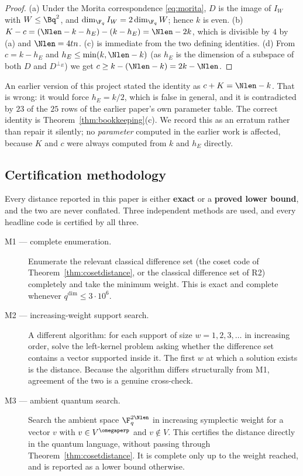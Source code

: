 \begin{proof}
(a) Under the Morita correspondence \eqref{eq:morita}, $D$ is the image of
$I_W$ with $W\le\Bq^2$, and $\dim_{\F_q}I_W=2\dim_{\F_q}W$; hence $k$ is even.
(b) $K-c=(\Nlen-k-h_E)-(k-h_E)=\Nlen-2k$, which is divisible by $4$ by (a)
and $\Nlen=4tn$. (c) is immediate from the two defining identities. (d) From
$c=k-h_E$ and $h_E\le\min(k,\Nlen-k)$ (as $h_E$ is the dimension of a subspace
of both $D$ and $D^{\perp_E}$) we get $c\ge k-(\Nlen-k)=2k-\Nlen$.
\end{proof}

\begin{remark}[erratum]
An earlier version of this project stated the identity as $c+K=\Nlen-k$. That
is wrong: it would force $h_E=k/2$, which is false in general, and it is
contradicted by $23$ of the $25$ rows of the earlier paper's own parameter
table. The correct identity is Theorem~\ref{thm:bookkeeping}(c). We record this
as an erratum rather than repair it silently; no \emph{parameter} computed in
the earlier work is affected, because $K$ and $c$ were always computed from
$k$ and $h_E$ directly.
\end{remark}

\subsection{Certification methodology}

Every distance reported in this paper is either \textbf{exact} or a
\textbf{proved lower bound}, and the two are never conflated. Three
independent methods are used, and every headline code is certified by all three.

\begin{description}
\item[M1 --- complete enumeration.] Enumerate the relevant classical difference
  set (the coset code of Theorem~\ref{thm:cosetdistance}, or the classical
  difference set of R2) completely and take the minimum weight. This is exact
  and complete whenever $q^{\dim}\le3\cdot10^6$.
\item[M2 --- increasing-weight support search.] A different algorithm: for each
  support of size $w=1,2,3,\dots$ in increasing order, solve the left-kernel
  problem asking whether the difference set contains a vector supported inside
  it. The first $w$ at which a solution exists is the distance. Because the
  algorithm differs structurally from M1, agreement of the two is a genuine
  cross-check.
\item[M3 --- ambient quantum search.] Search the ambient space
  $\F_q^{2\Nlen}$ in increasing symplectic weight for a vector $v$ with
  $v\in V^{\omegaperp}$ and $v\notin V$. This certifies the distance directly in
  the quantum language, without passing through
  Theorem~\ref{thm:cosetdistance}. It is complete only up to the weight reached,
  and is reported as a lower bound otherwise.
\end{description}

